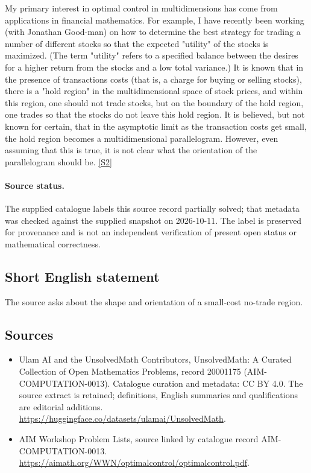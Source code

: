\documentclass[11pt]{article}
\newcommand{\sref}[2]{\hyperlink{source:#1:#2}{[S#2]}}
\begin{document}
My primary interest in optimal control in multidimensions has come from applications in financial mathematics. For example, I have recently been working (with Jonathan Good-man) on how to determine the best strategy for trading a number of different stocks so that the expected "utility" of the stocks is maximized. (The term "utility" refers to a specified balance between the desires for a higher return from the stocks and a low total variance.) It is known that in the presence of transactions costs (that is, a charge for buying or selling stocks), there is a "hold region" in the multidimensional space of stock prices, and within this region, one should not trade stocks, but on the boundary of the hold region, one trades so that the stocks do not leave this hold region. It is believed, but not known for certain, that in the asymptotic limit as the transaction costs get small, the hold region becomes a multidimensional parallelogram. However, even assuming that this is true, it is not clear what the orientation of the parallelogram should be. \sref{20001175}{2}
\paragraph{Source status.}
The supplied catalogue labels this source record partially solved; that metadata was checked against the supplied snapshot on 2026-10-11. The label is preserved for provenance and is not an independent verification of present open status or mathematical correctness.
\subsection{Short English statement}
The source asks about the shape and orientation of a small-cost no-trade region.
\subsection{Sources}
\begin{itemize}
\item[\hypertarget{source:20001175:1}{S1}] Ulam AI and the UnsolvedMath Contributors, UnsolvedMath: A Curated Collection of Open Mathematics Problems, record 20001175 (AIM-COMPUTATION-0013). Catalogue curation and metadata: CC BY 4.0. The source extract is retained; definitions, English summaries and qualifications are editorial additions.
\url{https://huggingface.co/datasets/ulamai/UnsolvedMath}.
\item[\hypertarget{source:20001175:2}{S2}] AIM Workshop Problem Lists, source linked by catalogue record AIM-COMPUTATION-0013.
\url{https://aimath.org/WWN/optimalcontrol/optimalcontrol.pdf}.
\end{itemize}
\end{document}

